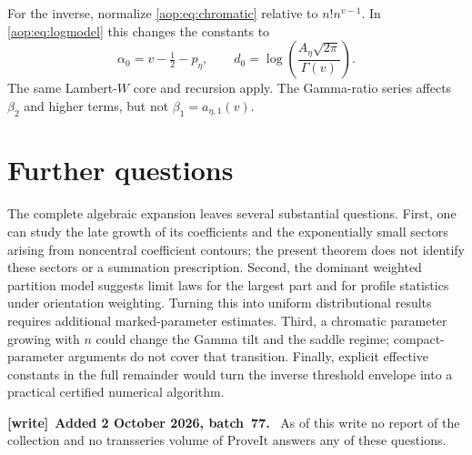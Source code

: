 \documentclass[11pt]{article}
\theoremstyle{remark}\newtheorem{remark}[theorem]{Remark}
\newenvironment{writenote}[1][]{\par\smallskip\begingroup\small
 \noindent\textbf{[write]}\if\relax\detokenize{#1}\relax\else~\textbf{#1.}\fi\ }%
 {\par\endgroup\smallskip}
\begin{document}
For the inverse, normalize \eqref{aop:eq:chromatic} relative to
$n!n^{v-1}$. In \eqref{aop:eq:logmodel} this changes the constants to
\[
 \alpha_0=v-\tfrac12-p_\eta,\qquad
 d_0=\log\left(\frac{A_\eta\sqrt{2\pi}}{\Gamma(v)}\right).
\]
The same Lambert-$W$ core and recursion apply. The Gamma-ratio series
affects $\beta_2$ and higher terms, but not
$\beta_1=a_{\eta,1}(v)$.

\section{Further questions}\label{aop:sec:questions}

The complete algebraic expansion leaves several substantial questions.
First, one can study the late growth of its coefficients and the
exponentially small sectors arising from noncentral coefficient
contours; the present theorem does not identify these sectors or a
summation prescription. Second, the dominant weighted partition model
suggests limit laws for the largest part and for profile statistics
under orientation weighting. Turning this into uniform distributional
results requires additional marked-parameter estimates. Third, a
chromatic parameter growing with $n$ could change the Gamma tilt and
the saddle regime; compact-parameter arguments do not cover that
transition. Finally, explicit effective constants in the full
remainder would turn the inverse threshold envelope into a practical
certified numerical algorithm.

\begin{writenote}[Added 2 October 2026, batch~77]
As of this write no report of the collection and no transseries volume of
ProveIt answers any of these questions.
\end{writenote}
\end{document}
